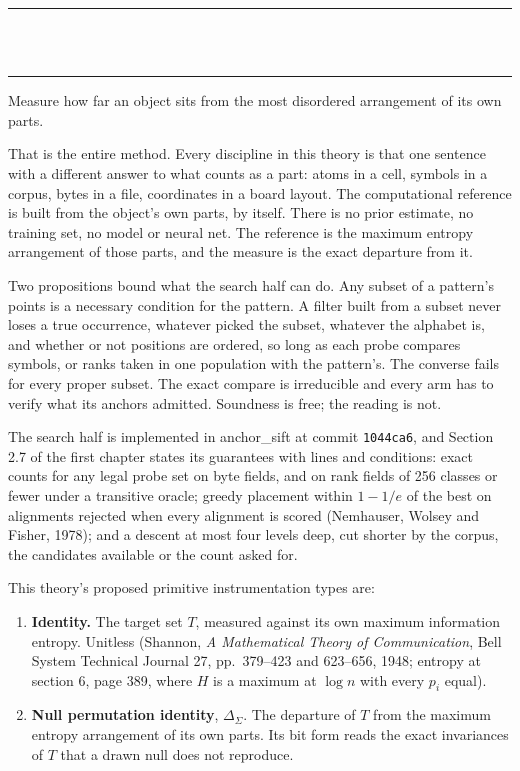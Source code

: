 \thispagestyle{empty}
\begin{center}
  \rule{\textwidth}{0.4pt}\\[0.9em]
  {\Large{}}\\[0.7em]
  \rule{\textwidth}{0.4pt}
\end{center}
\bigskip

\noindent Measure how far an object sits from the most disordered arrangement of its own parts.

That is the entire method. Every discipline in this theory is that one sentence with a different answer to
what counts as a part: atoms in a cell, symbols in a corpus, bytes in a file, coordinates in a board
layout. The computational reference is built from the object's own parts, by itself. There is no prior
estimate, no training set, no model or neural net. The reference is the maximum entropy arrangement of
those parts, and the measure is the exact departure from it.

Two propositions bound what the search half can do. Any subset of a pattern's points is a necessary
condition for the pattern. A filter built from a subset never loses a true occurrence, whatever
picked the subset, whatever the alphabet is, and whether or not positions are ordered, so long as
each probe compares symbols, or ranks taken in one population with the pattern's. The converse fails for every proper subset. The exact compare is irreducible and every
arm has to verify what its anchors admitted. Soundness is free; the reading is not.

The search half is implemented in anchor\_sift at commit \texttt{1044ca6}, and Section 2.7 of the
first chapter states its guarantees with lines and conditions: exact counts for any legal probe set
on byte fields, and on rank fields of 256 classes or fewer under a transitive oracle; greedy
placement within \(1 - 1/e\) of the best on alignments rejected when every alignment is scored
(Nemhauser, Wolsey and Fisher, 1978); and a descent at most four levels deep, cut shorter by the
corpus, the candidates available or the count asked for.

This theory's proposed primitive instrumentation types are:

\begin{enumerate}
  \item \textbf{Identity.} The target set \(T\), measured against its own maximum information
    entropy. Unitless (Shannon, \emph{A Mathematical Theory of Communication}, Bell System
    Technical Journal 27, pp.~379--423 and 623--656, 1948; entropy at section 6, page 389, where
    \(H\) is a maximum at \(\log n\) with every \(p_i\) equal).
  \item \textbf{Null permutation identity}, \(\Delta_{\Sigma}\). The departure of \(T\) from the
    maximum entropy arrangement of its own parts. Its bit form reads the exact invariances of \(T\)
    that a drawn null does not reproduce.
\end{enumerate}

